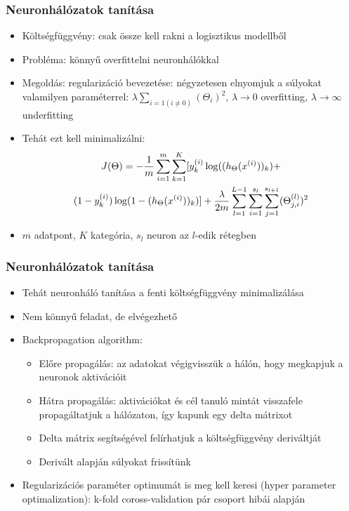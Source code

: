 \documentclass{beamer}
\begin{document}
\begin{frame}
\frametitle{Neuronhálózatok tanítása}
\begin{itemize}
  \setlength{\itemsep}{12pt}
  \item Költségfüggvény: csak össze kell rakni a logisztikus modellből
  \item Probléma: könnyű overfittelni neuronhálókkal
  \item Megoldás: regularizáció bevezetése: négyzetesen elnyomjuk a súlyokat valamilyen paraméterrel: $\lambda\sum_{i=1 (i\neq 0)}(\Theta_i)^2$, $\lambda\rightarrow 0$ overfitting, $\lambda\rightarrow\infty$ underfitting
  \item Tehát ezt kell minimalizálni:
    \begin{multline*}
\large J(\Theta) = - \frac{1}{m} \sum_{i=1}^m \sum_{k=1}^K [y^{(i)}_k \log ((h_\Theta (x^{(i)}))_k) + \\
 (1 - y^{(i)}_k)\log (1 - (h_\Theta(x^{(i)}))_k)] + 
  \frac{\lambda}{2m}\sum_{l=1}^{L-1} \sum_{i=1}^{s_l} \sum_{j=1}^{s_{l+1}} ( \Theta_{j,i}^{(l)})^2
\end{multline*}
\item $m$ adatpont, $K$ kategória, $s_l$ neuron az $l$-edik rétegben
\end{itemize}
\end{frame}

\begin{frame}
\frametitle{Neuronhálózatok tanítása}
\begin{itemize}
  \setlength{\itemsep}{12pt}
  \item Tehát neuronháló tanítása a fenti költségfüggvény minimalizálása
  \item Nem könnyű feladat, de elvégezhető
  \item Backpropagation algorithm:
  	\begin{itemize}
  		  \setlength{\itemsep}{6pt}

  	  		\item Előre propagálás: az adatokat végigvisszük a hálón, hogy megkapjuk a neuronok aktivációit
  	  		\item Hátra propagálás: aktivációkat és cél tanuló mintát visszafele propagáltatjuk a hálózaton, így kapunk egy delta mátrixot
  	  		\item Delta mátrix segítségével felírhatjuk a költségfüggvény deriváltját
  	  		\item Derivált alapján súlyokat frissítünk
  	\end{itemize}
  	\item Regularizációs paraméter optimumát is meg kell keresi (hyper parameter optimalization): k-fold coross-validation pár csoport hibái alapján
\end{itemize}
\end{frame}
\end{document}

